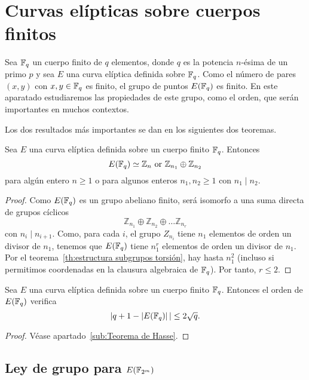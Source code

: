 \clearpage

\section{Curvas elípticas sobre cuerpos finitos}
\label{sec:Curvas elípticas sobre cuerpos finitos}

Sea $\mathbb{F}_q$ un cuerpo finito de $q$ elementos, donde $q$ es la potencia $n$-ésima de un primo $p$ y sea $E$ una curva elíptica definida sobre $\mathbb{F}_q$. Como el número de pares $(x, y)$ con $x, y \in \mathbb{F}_q$ es finito, el grupo de puntos $E(\mathbb{F}_q)$ es finito. En este aparatado estudiaremos las propiedades de este grupo, como el orden, que serán importantes en muchos contextos.

Los dos resultados más importantes se dan en los siguientes dos teoremas.

\begin{teorema}\label{th:estructura grupo puntos}
	Sea $E$ una curva elíptica definida sobre un cuerpo finito $\mathbb{F}_q$. Entonces
	$$
		E(\mathbb{F}_q) \simeq \mathbb{Z}_n \textrm{ or } \mathbb{Z}_{n_1} \oplus \mathbb{Z}_{n_2}
	$$
	para algún entero $n \ge 1$ o para algunos enteros $n_1, n_2 \ge 1$ con $n_1 \mid n_2$.
\end{teorema}
\begin{proof}
Como $E(\mathbb{F}_q)$ es un grupo abeliano finito, será isomorfo a una suma directa de grupos cíclicos
$$
	\mathbb{Z}_{n_1} \oplus \mathbb{Z}_{n_2} \oplus \dots \mathbb{Z}_{n_r}
$$
con $n_i \mid n_{i+1}$. Como, para cada $i$, el grupo $Z_{n_i}$ tiene $n_1$ elementos de orden un divisor de $n_1$, tenemos que $E(\mathbb{F}_q)$ tiene $n_1^r$ elementos de orden un divisor de $n_1$. Por el teorema~\ref{th:estructura subgrupos torsión}, hay hasta $n_1^2$ (incluso si permitimos coordenadas en la clausura algebraica de $\mathbb{F}_q$). Por tanto, $r \le 2$.
\end{proof}

\begin{teorema}\label{th:teorema de Hasse}
	Sea $E$ una curva elíptica definida sobre un cuerpo finito $\mathbb{F}_q$. Entonces el orden de $E(\mathbb{F}_q)$ verifica
	$$
		|q + 1 - \left\vert{E(\mathbb{F}_{q})}\right\vert| \le 2 \sqrt{q}.
	$$
\end{teorema}
\begin{proof}
	Véase apartado~\ref{sub:Teorema de Hasse}.
\end{proof}


\subsection{Ley de grupo para $E(\mathbb{F}_{2^m})$}
\label{sub:Ley de grupo para cuerpos base de característica 2}

